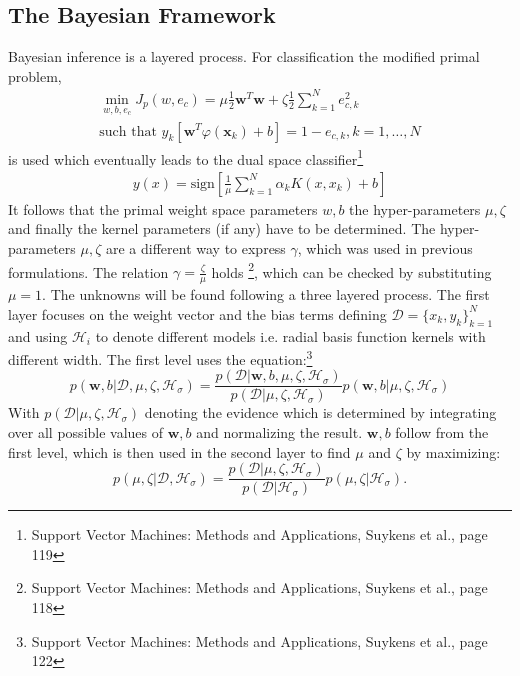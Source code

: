 \subsection{The Bayesian Framework}
Bayesian inference is a layered process. For classification the modified primal problem,
\begin{align}
\min\limits_{w,b,e_c} J_p (w,e_c) = \mu \frac{1}{2}\mathbf{w}^T\mathbf{w} + \zeta \frac{1}{2} \sum\limits_{k = 1}^{N} e^2_{c,k} \\
\text{such that } y_k [\mathbf{w}^T \varphi(\mathbf{x}_k) + b] = 1 - e_{c,k}, k = 1, \dots, N 
\end{align}
is used which eventually leads to the dual space classifier\footnote{Support Vector Machines: Methods and Applications, Suykens et al., page 119}
\begin{align}
y(x) = \text{sign}[\frac{1}{\mu} \sum\limits_{k=1}^{N}\alpha_k K(x,x_k) + b]
\end{align} 
It follows that the primal weight space parameters $w,b$ the hyper-parameters $\mu,\zeta$ and finally the kernel parameters (if any) have to be determined. The hyper-parameters $\mu,\zeta$ are a different way to express $\gamma$, which was used in previous formulations. The relation $\gamma = \frac{\zeta}{\mu}$ holds \footnote{Support Vector Machines: Methods and Applications, Suykens et al., page 118}, which can be checked by substituting $\mu = 1$.
The unknowns will be found following a three layered process. The first layer focuses on the weight vector and the bias terms defining $\mathcal{D} = \{x_k,y_k\}^N_{k = 1}$ and using $\mathcal{H}_{i}$ to denote different models i.e. radial basis function kernels with different width. The first level uses the equation:\footnote{Support Vector Machines: Methods and Applications, Suykens et al., page 122}
\begin{equation}
p(\mathbf{w},b|\mathcal{D},\mu,\zeta,\mathcal{H}_\sigma) = \frac{p(\mathcal{D}|\mathbf{w},b,\mu,\zeta,\mathcal{H}_\sigma)}{p(\mathcal{D}|\mu,\zeta,\mathcal{H}_\sigma)} p(\mathbf{w},b|\mu,\zeta,\mathcal{H}_\sigma)
\end{equation}
With $p(\mathcal{D}|\mu,\zeta,\mathcal{H}_\sigma)$ denoting the evidence which is determined by integrating over all possible values of $\mathbf{w},b$ and normalizing the result. $\mathbf{w},b$ follow from the first level, which is then used in the second layer to find $\mu$ and $\zeta$ by maximizing:
\begin{equation}
p(\mu,\zeta|\mathcal{D},\mathcal{H}_\sigma) = \frac{p(\mathcal{D}|\mu,\zeta,\mathcal{H}_\sigma)}{p(\mathcal{D}|\mathcal{H}_\sigma)} p(\mu,\zeta|\mathcal{H}_\sigma). 
\end{equation}

